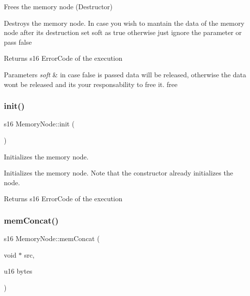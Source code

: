 Frees the memory node (Destructor) 

Destroys the memory node. In case you wish to mantain the data of the memory node after it\textquotesingle{}s destruction set soft as true otherwise just ignore the parameter or pass false

\begin{DoxyReturn}{Returns}
s16 Error\+Code of the execution 
\end{DoxyReturn}

\begin{DoxyParams}{Parameters}
{\em soft} & in case false is passed data will be released, otherwise the data won\textquotesingle{}t be released and it\textquotesingle{}s your responsability to free it. free \\
\hline
\end{DoxyParams}
\mbox{\label{class_memory_node_a7d5525e6dc8c0c41e8d32a14534cf261}} 
\subsubsection{\texorpdfstring{init()}{init()}}
{\footnotesize\ttfamily s16 Memory\+Node\+::init (\begin{DoxyParamCaption}{ }\end{DoxyParamCaption})}



Initializes the memory node. 

Initializes the memory node. Note that the constructor already initializes the node.

\begin{DoxyReturn}{Returns}
s16 Error\+Code of the execution 
\end{DoxyReturn}
\mbox{\label{class_memory_node_affb353802eb004abced42bcfc1e10d73}} 
\subsubsection{\texorpdfstring{mem\+Concat()}{memConcat()}}
{\footnotesize\ttfamily s16 Memory\+Node\+::mem\+Concat (\begin{DoxyParamCaption}\item[{void $\ast$}]{src,  }\item[{u16}]{bytes }\end{DoxyParamCaption})}



